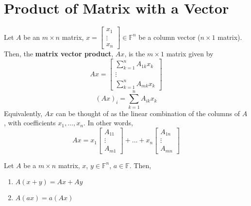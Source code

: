 \documentclass[letterpaper,12pt]{article}
\begin{document}
\section*{Product of Matrix with a Vector}
\begin{definition}
Let $A$ be an $m \times n$ matrix, $x = \begin{bmatrix} x_1 \\ \vdots \\ x_n \end{bmatrix} \in \mathbb{F}^n$ be a column vector ($n \times 1$ matrix). Then, the \textbf{matrix vector product}, $Ax$, is the $m \times 1$ matrix given by
\begin{equation*}
    Ax = \begin{bmatrix} \sum_{k=1}^n A_{1k} x_k \\ \vdots \\ \sum_{k=1}^n A_{mk} x_k \end{bmatrix}
\end{equation*}
\begin{equation*}
    (Ax)_i = \sum_{k=1}^n A_{ik} x_{k}
\end{equation*}
Equivalently, $Ax$ can be thought of as the linear combination of the columns of $A$, with coefficients $x_1, \dots, x_n$. In other words,
\begin{equation*}
    Ax = x_1 \begin{bmatrix} A_{11} \\ \vdots \\ A_{m1} \end{bmatrix} + \dots + x_n \begin{bmatrix} A_{1n} \\  \vdots \\ A_{mn} \end{bmatrix}
\end{equation*}
\end{definition}

\begin{theorem}
Let $A$ be a $m \times n$ matrix, $x$, $y \in \mathbb{F}^n$, $a \in \mathbb{F}$. Then,
\begin{enumerate}
    \item $A(x + y) = Ax + Ay$
    \item $A(ax) = a(Ax)$
\end{enumerate}
\end{theorem}
\end{document}
